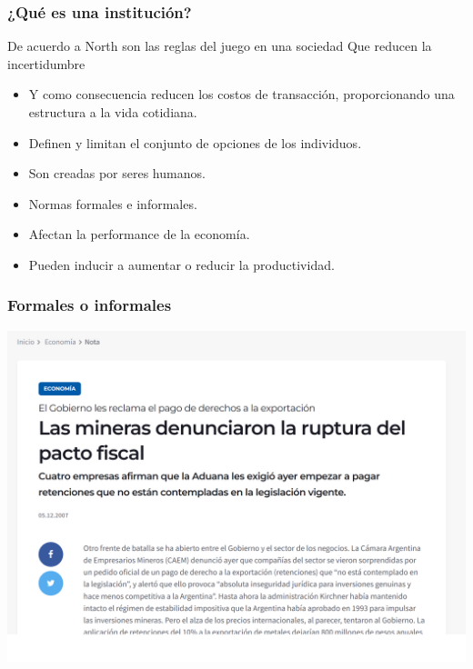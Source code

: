 \documentclass{beamer}
\begin{document}
\begin{frame}
\frametitle{¿Qué es una institución?}
De acuerdo a North  son las reglas del juego en una sociedad Que reducen la incertidumbre
  
 
    \begin{itemize}
        \item Y como consecuencia reducen los costos de transacción, proporcionando una estructura a la vida cotidiana.\vspace{2mm}
        \item Definen y limitan el conjunto de opciones de los individuos.\vspace{2mm}
        \item Son creadas por seres humanos.\vspace{2mm}
        \end{itemize}
        \begin{itemize}
        \item Normas formales e informales.\vspace{2mm}
        \item Afectan la performance de la economía.\vspace{2mm}
        \end{itemize}
        \begin{itemize}
        \item Pueden inducir a aumentar o reducir la productividad.
        \end{itemize} 
 
\end{frame}

\begin{frame}
\frametitle{Formales o informales}
\centering
\includegraphics[scale=0.4]{Slides Principios de Economia/Figures/Mina2.png}
\end{frame}
\end{document}
